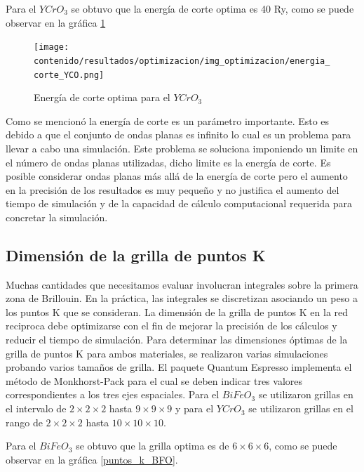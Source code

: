 \noindent Para el $YCrO_{3}$ se obtuvo que la energ\'ia de corte optima es 40 
Ry, como 
se puede observar en la gr\'afica \ref{energia_corte_YCO}

\begin{figure}[H]
    \centering
    \texttt{[image: contenido/resultados/optimizacion/img\_optimizacion/energia\_corte\_YCO.png]}
    \caption[Energ\'ia de corte $YCrO_{3}$]{Energ\'ia de corte optima 
        para el $YCrO_{3}$}
    \label{energia_corte_YCO}
\end{figure}

\noindent Como se mencion\'o la energ\'ia de corte es un par\'ametro 
importante. Esto es 
debido a que el conjunto de ondas planas es infinito lo cual es un problema 
para llevar a cabo una simulaci\'on. Este problema se soluciona imponiendo un 
limite en el n\'umero de ondas planas utilizadas, dicho limite es la energ\'ia 
de corte. Es posible considerar ondas planas m\'as all\'a de la energ\'ia de 
corte pero el aumento en la precisi\'on de los resultados es muy peque\~no y no 
justifica el aumento del tiempo de simulaci\'on y de la capacidad de c\'alculo 
computacional requerida para concretar la simulaci\'on.

\subsection{Dimensi\'on de la grilla de puntos K}

Muchas cantidades que necesitamos evaluar involucran integrales sobre la 
primera zona de Brillouin. En la pr\'actica, las integrales se discretizan 
asociando un peso a los puntos K que se consideran.
La dimensi\'on de la grilla de puntos K en la red reciproca debe optimizarse 
con el fin de mejorar la precisi\'on de los 
c\'alculos y reducir el tiempo de simulaci\'on. Para determinar las dimensiones 
\'optimas de la grilla de puntos K para ambos materiales, se realizaron varias 
simulaciones probando varios tama\~nos de grilla. El paquete Quantum Espresso 
implementa el m\'etodo de Monkhorst-Pack para el cual se deben indicar tres 
valores correspondientes a los tres ejes espaciales. Para el $BiFeO_{3}$ se 
utilizaron grillas en el intervalo de $2 \times 2 \times 2$ hasta $9 \times 9 
\times 9$ y para el $YCrO_{3}$ se utilizaron grillas en el rango de $2 \times 2 
\times 2$ hasta $10 \times 10 \times 10$.

\noindent Para el $BiFeO_{3}$ se obtuvo que la grilla optima es de $6 \times 6 
\times 6$, 
como se puede observar en la gr\'afica \ref{puntos_k_BFO}.

